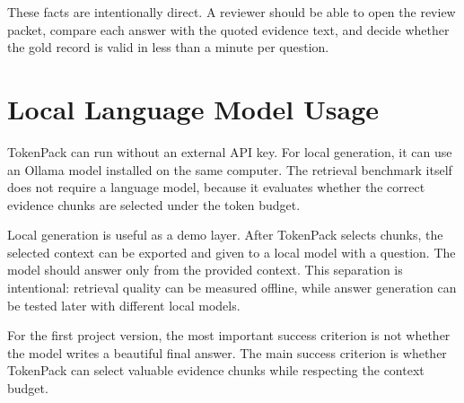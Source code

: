 \documentclass[11pt]{article}
\begin{document}
These facts are intentionally direct. A reviewer should be able to open the review packet, compare each answer with the quoted evidence text, and decide whether the gold record is valid in less than a minute per question.

\section{Local Language Model Usage}
TokenPack can run without an external API key. For local generation, it can use an Ollama model installed on the same computer. The retrieval benchmark itself does not require a language model, because it evaluates whether the correct evidence chunks are selected under the token budget.

Local generation is useful as a demo layer. After TokenPack selects chunks, the selected context can be exported and given to a local model with a question. The model should answer only from the provided context. This separation is intentional: retrieval quality can be measured offline, while answer generation can be tested later with different local models.

For the first project version, the most important success criterion is not whether the model writes a beautiful final answer. The main success criterion is whether TokenPack can select valuable evidence chunks while respecting the context budget.
\end{document}
